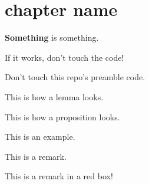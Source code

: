 \chapter{chapter name}
\begin{defn}[something]
\textbf{Something} is something.
\end{defn}

\begin{theorem}
If it works, don't touch the code!
\end{theorem}
\begin{corollary}
Don't touch this repo's preamble code.
\end{corollary}
\begin{lemma}
This is how a lemma looks.
\end{lemma}
\begin{proposition}
This is how a proposition looks.
\end{proposition}
\begin{example}
This is an example.
\end{example}
\begin{remark}
This is a remark.
\end{remark}
\begin{remark*}
This is a remark in a red box!
\end{remark*}




% 